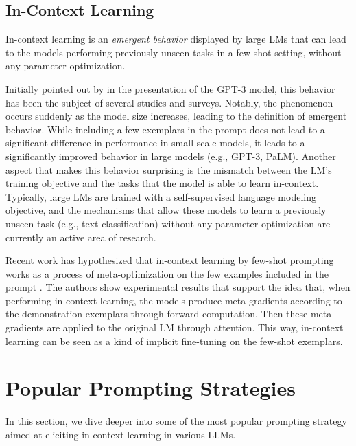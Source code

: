 \subsection{In-Context Learning}
In-context learning is an \textit{emergent behavior} displayed by large LMs that can lead to the models performing previously unseen tasks in a few-shot setting, without any parameter optimization. 

Initially pointed out by \cite{brown2020language} in the presentation of the GPT-3 model, this behavior has been the subject of several studies and surveys. Notably, the phenomenon occurs suddenly as the model size increases, leading to the definition of emergent behavior. While including a few exemplars in the prompt does not lead to a significant difference in performance in small-scale models, it leads to a significantly improved behavior in large models (e.g., GPT-3, PaLM). Another aspect that makes this behavior surprising is the mismatch between the LM’s training objective and the tasks that the model is able to learn in-context. Typically, large LMs are trained with a self-supervised language modeling objective, and the mechanisms that allow these models to learn a previously unseen task (e.g., text classification) without any parameter optimization are currently an active area of research.

Recent work has hypothesized that in-context learning by few-shot prompting works as a process of meta-optimization on the few examples included in the prompt \citep{dai2022can}. The authors show experimental results that support the idea that, when performing in-context learning, the models produce meta-gradients according to the demonstration exemplars through forward computation. Then these meta gradients are applied to the original LM through attention. This way, in-context learning can be seen as a kind of implicit fine-tuning on the few-shot exemplars.



\section{Popular Prompting Strategies}
In this section, we dive deeper into some of the most popular prompting strategy aimed at eliciting in-context learning in various LLMs.


